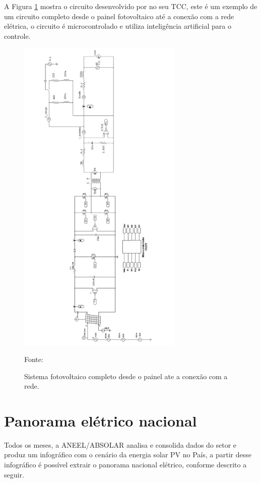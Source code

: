 A Figura \ref{fig:edu_ci} mostra o circuito desenvolvido por \cite{tcc_edu} no seu TCC, este é um exemplo de um circuito completo desde o painel fotovoltaico até a conexão com a rede elétrica, o circuito é microcontrolado e utiliza inteligência artificial para o controle.

\begin{figure}[H]
    \centering
    \includegraphics[width=0.7\textwidth]{./Figuras/edu_ci.png}
    \caption{Sistema fotovoltaico completo desde o painel ate a conexão com a rede.}{Fonte: \cite{tcc_edu}}
   \label{fig:edu_ci}
\end{figure}

\section{Panorama elétrico nacional}

Todos os meses, a ANEEL/ABSOLAR \cite{ABSOLAR} analisa e consolida dados do setor e produz um infográfico com o cenário da energia solar PV no País, a partir desse infográfico é possível extrair o panorama nacional elétrico, conforme descrito a seguir.

